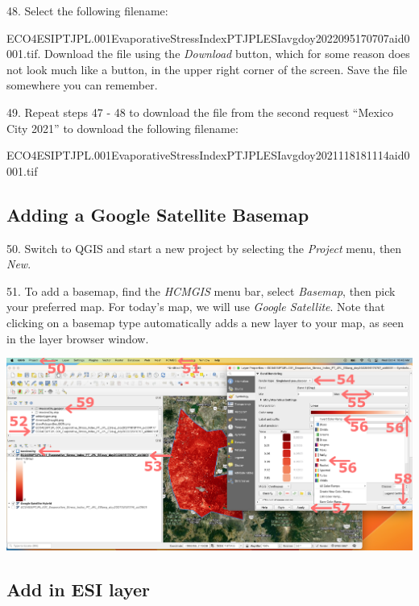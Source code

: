 \documentclass[oneside,a4paper,11pt,explicit]{book}
\begin{document}
\vspace{.5em}

48. Select the following filename: 

ECO4ESIPTJPL.001\textunderscore Evaporative\textunderscore Stress\textunderscore Index\textunderscore PT\textunderscore JPL\textunderscore ESIavg\textunderscore doy2022095170707\textunderscore aid0001.tif. Download the file using the \textit{Download} button, which for some reason does not look much like a button, in the upper right corner of the screen. Save the file somewhere you can remember. 

49. Repeat steps 47 - 48 to download the file from the second request ``Mexico City 2021'' to download the following filename: 

ECO4ESIPTJPL.001\textunderscore Evaporative\textunderscore Stress\textunderscore Index\textunderscore PT\textunderscore JPL\textunderscore ESIavg\textunderscore doy2021118181114\textunderscore aid0001.tif 

\subsection{Adding a Google Satellite Basemap}

50. Switch to QGIS and start a new project by selecting the \textit{Project} menu, then \textit{New}.

51. To add a basemap, find the \textit{HCMGIS} menu bar, select \textit{Basemap}, then pick your preferred map. For today's map, we will use \textit{Google Satellite}. Note that clicking on a basemap type automatically adds a new layer to your map, as seen in the layer browser window.

\vspace{.5em}

\centerline{\includegraphics[width=\textwidth]{addESIlayer.png}}

\subsection{Add in ESI layer}
\end{document}
